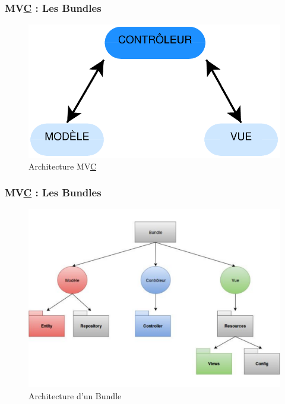 \speaker{\Florian}


\begin{frame}
  \frametitle{MV\underline{C} : Les Bundles}   
\begin{figure}[!h]
	\begin{center}
	\includegraphics[scale=0.5]{images/mvcControleur}
	\caption{Architecture MV\underline{C}}
	\end{center}
\end{figure}
\end{frame}


\begin{frame}
  \frametitle{MV\underline{C} : Les Bundles}   
\begin{figure}[!h]
	\begin{center}
	\includegraphics[scale=0.3]{images/bundles}
	\caption{Architecture d'un Bundle}
	\end{center}
\end{figure}
\end{frame}

